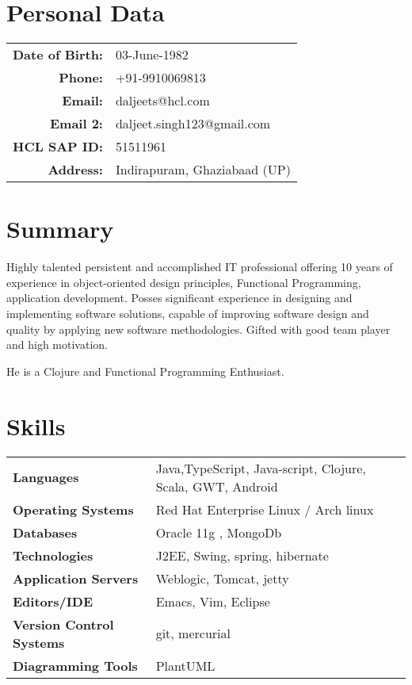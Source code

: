 \documentclass[letterpaper]{article}
\date{\today}
\title{}
\begin{document}
\section{Personal Data}
\label{sec:orgheadline1}
\begin{center}
\begin{tabular}{rp{}}
\textbf{Date of Birth:} & 03-June-1982\\
\textbf{Phone:} & +91-9910069813\\
\textbf{Email:} & daljeets@hcl.com\\
\textbf{Email 2:} & daljeet.singh123@gmail.com\\
\textbf{HCL SAP ID:} & 51511961\\
\textbf{Address:} & Indirapuram, Ghaziabaad (UP)\\
\end{tabular}
\end{center}

\section{Summary}
\label{sec:orgheadline2}

Highly talented persistent and accomplished IT professional offering 10 years of experience in object-oriented design principles, Functional Programming, application development. Posses significant experience in designing and implementing software solutions, capable of improving software design and quality by applying new software methodologies. Gifted with good team player and high motivation.  

He is a Clojure and Functional Programming Enthusiast. 

\section{Skills}
\label{sec:orgheadline3}

\begin{center}
\begin{tabular}{ll}
\textbf{Languages} & Java,TypeScript, Java-script, Clojure, Scala, GWT, Android\\
\textbf{Operating Systems} & Red Hat Enterprise Linux / Arch linux\\
\textbf{Databases} & Oracle 11g , MongoDb\\
\textbf{Technologies} & J2EE, Swing, spring, hibernate\\
\textbf{Application Servers} & Weblogic, Tomcat, jetty\\
\textbf{Editors/IDE} & Emacs, Vim, Eclipse\\
\textbf{Version Control Systems} & git, mercurial\\
\textbf{Diagramming Tools} & PlantUML\\
\end{tabular}
\end{center}
\end{document}
